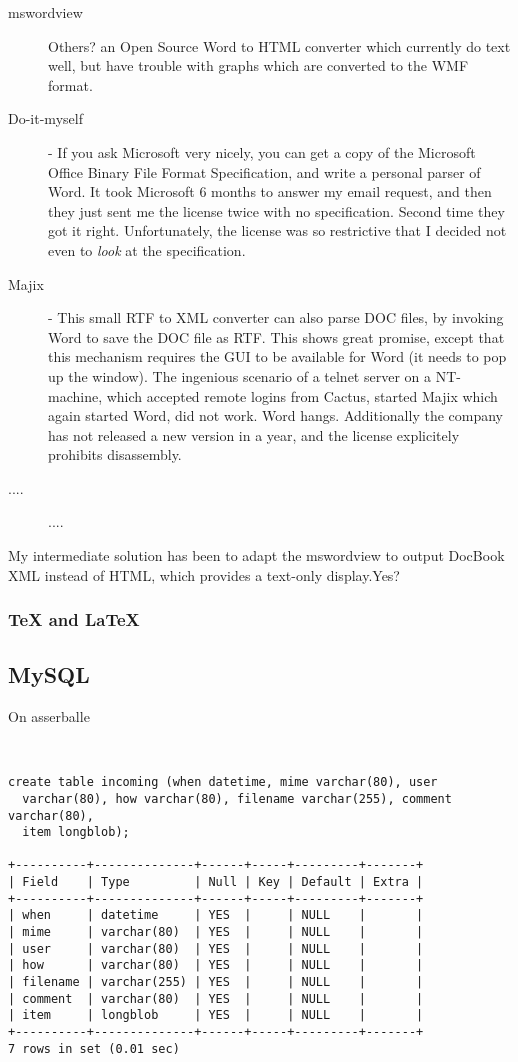 \begin{description}
  
\item[mswordview] \textsf{Others?} an Open Source Word to HTML
  converter which currently do text well, but have trouble with graphs
  which are converted to the WMF format.
\item[Do-it-myself] - If you ask Microsoft very nicely, you can get a
  copy of the Microsoft Office Binary File Format Specification, and
  write a personal parser of Word.  It took Microsoft 6 months to
  answer my email request, and then they just sent me the license
  twice with no specification.  Second time they got it right.
  Unfortunately, the license was so restrictive that I decided not
  even to \textit{look} at the specification.
\item[Majix] - This small RTF to XML converter can also parse DOC
  files, by invoking Word to save the DOC file as RTF.  This shows
  great promise, except that this mechanism requires the GUI to be
  available for Word (it needs to pop up the window).  The ingenious
  scenario of a telnet server on a NT-machine, which accepted remote
  logins from Cactus, started Majix which again started Word, did not
  work.  Word hangs.   Additionally the company has not released a new
  version in a year, and the license explicitely prohibits
  disassembly.
\item[....]....
\end{description}

My intermediate solution has been to adapt the mswordview to output
DocBook XML instead of HTML, which provides a text-only
display.\textsf{Yes?}


\subsubsection{{\TeX} and {\LaTeX}}




\subsection{MySQL}
On asserballe

\begin{verbatim}


create table incoming (when datetime, mime varchar(80), user
  varchar(80), how varchar(80), filename varchar(255), comment varchar(80),
  item longblob);

+----------+--------------+------+-----+---------+-------+
| Field    | Type         | Null | Key | Default | Extra |
+----------+--------------+------+-----+---------+-------+
| when     | datetime     | YES  |     | NULL    |       |
| mime     | varchar(80)  | YES  |     | NULL    |       |
| user     | varchar(80)  | YES  |     | NULL    |       |
| how      | varchar(80)  | YES  |     | NULL    |       |
| filename | varchar(255) | YES  |     | NULL    |       |
| comment  | varchar(80)  | YES  |     | NULL    |       |
| item     | longblob     | YES  |     | NULL    |       |
+----------+--------------+------+-----+---------+-------+
7 rows in set (0.01 sec)


\end{verbatim}

